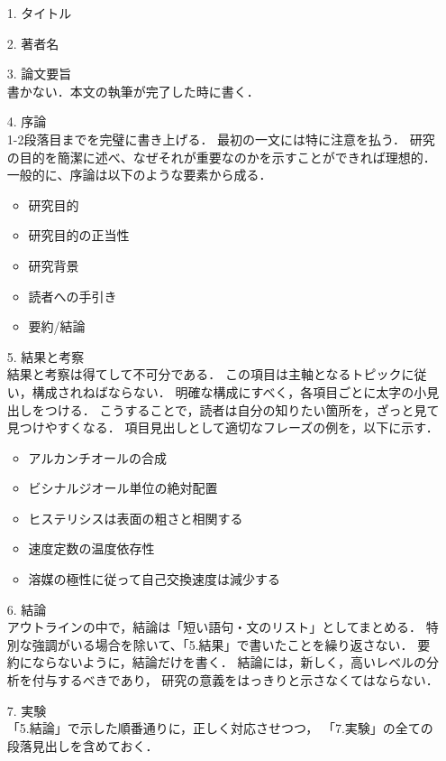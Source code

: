 \documentclass[twocolumn, 10pt,a4j]{jarticle}
\begin{document}
    \begin{itemize}
      \item[1.] \mbox{タイトル}  
      \item[2.] \mbox{著者名} 
      \item[3.] \mbox{論文要旨} \\
      書かない．本文の執筆が完了した時に書く．
      
      \item[4.] \mbox{序論} \\
      1-2段落目までを完璧に書き上げる．
      最初の一文には特に注意を払う．
      研究の目的を簡潔に述べ、なぜそれが重要なのかを示すことができれば理想的．
      一般的に、序論は以下のような要素から成る．

        \begin{itemize}
          \item 研究目的
          \item 研究目的の正当性
          \item 研究背景
          \item 読者への手引き
          \item 要約/結論
        \end{itemize}

      \item[5.] \mbox{結果と考察} \\
      結果と考察は得てして不可分である．
      この項目は主軸となるトピックに従い，構成されねばならない．
      明確な構成にすべく，各項目ごとに太字の小見出しをつける．
      こうすることで，読者は自分の知りたい箇所を，ざっと見て見つけやすくなる．
      項目見出しとして適切なフレーズの例を，以下に示す．

        \begin{itemize}
          \item アルカンチオールの合成
          \item ビシナルジオール単位の絶対配置
          \item ヒステリシスは表面の粗さと相関する
          \item 速度定数の温度依存性
          \item 溶媒の極性に従って自己交換速度は減少する
        \end{itemize}

      \item[6.] \mbox{結論} \\
      アウトラインの中で，結論は「短い語句・文のリスト」としてまとめる．
      特別な強調がいる場合を除いて、「5.結果」で書いたことを繰り返さない．
      要約にならないように，結論だけを書く．
      結論には，新しく，高いレベルの分析を付与するべきであり，
      研究の意義をはっきりと示さなくてはならない．
       
      \item[7.] \mbox{実験} \\
      「5.結論」で示した順番通りに，正しく対応させつつ，
      「7.実験」の全ての段落見出しを含めておく．

    \end{itemize}
\end{document}
